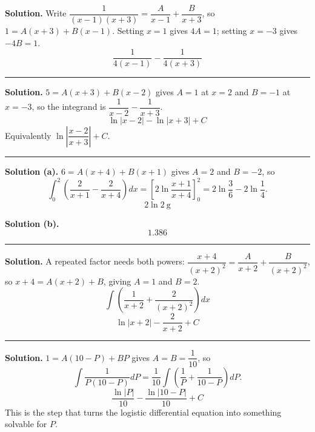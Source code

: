\documentclass[12pt]{article}
\begin{document}



\textbf{Solution.} Write $\dfrac{1}{(x-1)(x+3)} = \dfrac{A}{x-1} + \dfrac{B}{x+3}$,
so $1 = A(x+3) + B(x-1)$. Setting $x = 1$ gives $4A = 1$; setting $x = -3$ gives
$-4B = 1$.
\[ \boxed{\frac{1}{4(x - 1)} - \frac{1}{4(x + 3)}} \]

\vspace{0.15cm}\noindent\rule{\linewidth}{0.2pt}


\textbf{Solution.} $5 = A(x+3) + B(x-2)$ gives $A = 1$ at $x = 2$ and $B = -1$
at $x = -3$, so the integrand is $\dfrac{1}{x-2} - \dfrac{1}{x+3}$.
\[ \boxed{\ln|x - 2| - \ln|x + 3| + C} \]
Equivalently $\ln\left|\dfrac{x-2}{x+3}\right| + C$.

\vspace{0.15cm}\noindent\rule{\linewidth}{0.2pt}


\textbf{Solution (a).} $6 = A(x+4) + B(x+1)$ gives $A = 2$ and $B = -2$, so
\[ \int_0^2\left(\frac{2}{x+1} - \frac{2}{x+4}\right)dx
   = \left[2\ln\frac{x+1}{x+4}\right]_0^2
   = 2\ln\frac{3}{6} - 2\ln\frac{1}{4}. \]
\[ \boxed{2\ln 2\ \text{g}} \]

\textbf{Solution (b).}
\[ \boxed{1.386} \]

\vspace{0.15cm}\noindent\rule{\linewidth}{0.2pt}


\textbf{Solution.} A repeated factor needs both powers:
$\dfrac{x+4}{(x+2)^2} = \dfrac{A}{x+2} + \dfrac{B}{(x+2)^2}$, so
$x + 4 = A(x+2) + B$, giving $A = 1$ and $B = 2$.
\[ \int\left(\frac{1}{x+2} + \frac{2}{(x+2)^2}\right)dx \]
\[ \boxed{\ln|x + 2| - \frac{2}{x + 2} + C} \]

\vspace{0.15cm}\noindent\rule{\linewidth}{0.2pt}


\textbf{Solution.} $1 = A(10 - P) + BP$ gives $A = B = \dfrac{1}{10}$, so
\[ \int\frac{1}{P(10-P)}dP
   = \frac{1}{10}\int\left(\frac{1}{P} + \frac{1}{10-P}\right)dP . \]
\[ \boxed{\frac{\ln|P|}{10} - \frac{\ln|10 - P|}{10} + C} \]
This is the step that turns the logistic differential equation into something
solvable for $P$.
\end{document}
